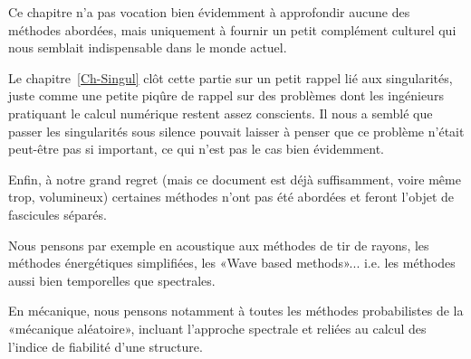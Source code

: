 Ce chapitre n'a pas vocation bien évidemment à approfondir aucune des méthodes abordées, mais uniquement à fournir un petit complément culturel qui nous semblait indispensable dans le monde actuel.

\medskip
Le chapitre~\ref{Ch-Singul} clôt cette partie sur un petit rappel lié aux singularités, juste comme une petite piqûre de rappel sur des problèmes dont les ingénieurs pratiquant le calcul numérique restent assez conscients. Il nous a semblé que passer les singularités sous silence pouvait laisser à penser que ce problème n'était peut-être pas si important, ce qui n'est pas le cas bien évidemment.


\medskip
Enfin, à notre grand regret (mais ce document est déjà suffisamment, voire même trop, volumineux) certaines méthodes n'ont pas été abordées et feront l'objet de fascicules séparés.

Nous pensons par exemple en acoustique aux méthodes de tir de rayons, les méthodes énergétiques simplifiées, les «Wave based methods»... i.e. les méthodes aussi bien temporelles que spectrales.

En mécanique, nous pensons notamment à toutes les méthodes probabilistes de la «mécanique aléatoire», incluant l'approche spectrale et reliées au calcul des l'indice de fiabilité d'une structure.


